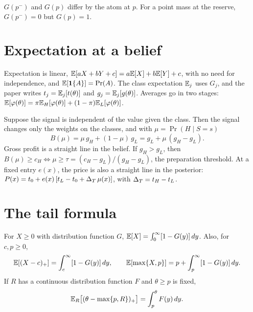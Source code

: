 \begin{watchout}
\(G(p^-)\) and \(G(p)\) differ by the atom at \(p\). For a point mass at the reserve, \(G(p^-)=0\) but \(G(p)=1\).
\end{watchout}

\section{Expectation at a belief}\label{sec:toolkit-expectation}

Expectation is linear, \(\mathbb{E}[aX+bY+c]=a\mathbb{E}[X]+b\mathbb{E}[Y]+c\), with no need for independence, and
\(\mathbb{E}[\mathbf{1}\{A\}]=\Pr(A)\). The class expectation \(\mathbb{E}_j\) uses \(G_j\), and the paper writes
\(t_j=\mathbb{E}_j[t(\theta)]\) and \(g_j=\mathbb{E}_j[g(\theta)]\). Averages go in two stages:
\(\mathbb{E}[\varphi(\theta)]=\pi\mathbb{E}_H[\varphi(\theta)]+(1-\pi)\mathbb{E}_L[\varphi(\theta)]\).

Suppose the signal is independent of the value given the class. Then the signal changes only the weights on the
classes, and with \(\mu=\Pr(H\mid S=s)\)
\begin{equation}\label{eq:toolkit-B}
B(\mu)=\mu\,g_H+(1-\mu)\,g_L=g_L+\mu\,(g_H-g_L).
\end{equation}
Gross profit is a straight line in the belief. If \(g_H>g_L\), then
\(B(\mu)\ge c_H\iff\mu\ge\tau=(c_H-g_L)/(g_H-g_L)\), the preparation threshold. At a fixed entry \(e(x)\), the price is
also a straight line in the posterior: \(P(x)=t_0+e(x)\,[t_L-t_0+\Delta_T\,\mu(x)]\), with \(\Delta_T=t_H-t_L\).

\section{The tail formula}\label{sec:toolkit-tail}

\begin{keyidea}
For \(X\ge0\) with distribution function \(G\), \(\mathbb{E}[X]=\int_0^\infty[1-G(y)]\,dy\). Also, for \(c,p\ge0\),
\begin{equation}\label{eq:toolkit-pospart} \mathbb{E}[(X-c)_+]=\int_c^\infty[1-G(y)]\,dy,\qquad \mathbb{E}[\max\{X,p\}]=p+\int_p^\infty[1-G(y)]\,dy. \end{equation}
If \(R\) has a continuous distribution function \(F\) and \(\theta\ge p\) is fixed,
\begin{equation}\label{eq:toolkit-fixed}
\mathbb{E}_R\bigl[(\theta-\max\{p,R\})_+\bigr]=\int_p^\theta F(y)\,dy.
\end{equation}
\end{keyidea}

